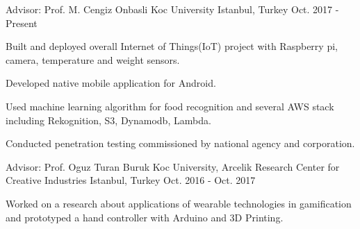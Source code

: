 \vspace{\acvSectionRemove}


\begin{cventries}
  \cventry
    {Advisor: Prof. M. Cengiz Onbasli} %
    {Koc University} %
    {Istanbul, Turkey} %
    {Oct. 2017 - Present} %
    {
      \begin{cvitems} %
        \item {Built and deployed overall Internet of Things(IoT) project with Raspberry pi, camera, temperature and weight sensors.  }
        \item {Developed native mobile application for Android. }
       	\item {Used machine learning algorithm for food recognition and several AWS stack including Rekognition, S3, Dynamodb, Lambda.} 
        \item {Conducted penetration testing commissioned by national agency and corporation.}
      \end{cvitems}
    }

  \cventry
    {Advisor: Prof. Oguz Turan Buruk} %
    {Koc University, Arcelik Research Center for Creative Industries} %
    {Istanbul, Turkey} %
    {Oct. 2016 - Oct. 2017} %
    {
      \begin{cvitems} %
         \item {Worked on a research about applications  of wearable technologies in gamification and prototyped a hand controller with Arduino and 3D Printing.  }
      \end{cvitems}
    }

\end{cventries}
